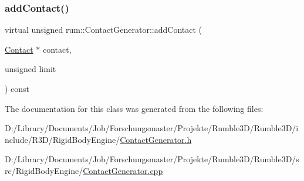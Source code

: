 \subsubsection{\texorpdfstring{add\+Contact()}{addContact()}}
{\footnotesize\ttfamily virtual unsigned rum\+::\+Contact\+Generator\+::add\+Contact (\begin{DoxyParamCaption}\item[{\mbox{\hyperlink{classrum_1_1_contact}{Contact}} $\ast$}]{contact,  }\item[{unsigned}]{limit }\end{DoxyParamCaption}) const\hspace{0.3cm}{\ttfamily [virtual]}}



The documentation for this class was generated from the following files\+:\begin{DoxyCompactItemize}
\item 
D\+:/\+Library/\+Documents/\+Job/\+Forschungsmaster/\+Projekte/\+Rumble3\+D/\+Rumble3\+D/include/\+R3\+D/\+Rigid\+Body\+Engine/\mbox{\hyperlink{_contact_generator_8h}{Contact\+Generator.\+h}}\item 
D\+:/\+Library/\+Documents/\+Job/\+Forschungsmaster/\+Projekte/\+Rumble3\+D/\+Rumble3\+D/src/\+Rigid\+Body\+Engine/\mbox{\hyperlink{_contact_generator_8cpp}{Contact\+Generator.\+cpp}}\end{DoxyCompactItemize}
